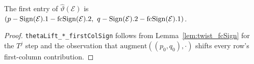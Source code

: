 \begin{theorem}
  \label{thm:thetaLift_first_entry}
  \leanok
  The first entry of $\hat\vartheta(\mathcal{E})$ is $(p - \mathrm{Sign}(\mathcal{E}).1 - \mathrm{fcSign}(\mathcal{E}).2,\ q - \mathrm{Sign}(\mathcal{E}).2 - \mathrm{fcSign}(\mathcal{E}).1)$.
\end{theorem}
\begin{proof}
  \leanok
  \texttt{thetaLift\_*\_firstColSign} follows from Lemma~\ref{lem:twist_fcSign} for the $T^j$ step and the observation that $\mathrm{augment}((p_0, q_0), \cdot)$ shifts every row's first-column contribution.
\end{proof}

